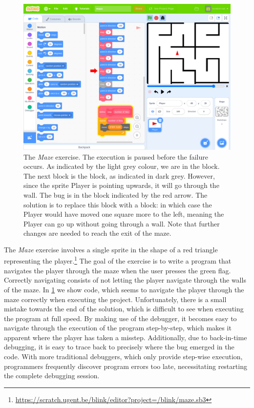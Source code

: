 \documentclass[../main]{subfiles}
\begin{document}
\begin{figure}
    \begin{wide}
        \includegraphics[width=\linewidth]{maze}
    \end{wide}
    \caption[The Maze exercise.]{
        The \emph{Maze} exercise.
        The execution is paused before the failure occurs.
        As indicated by the light grey colour, we are in the  block.
        The next block is the  block, as indicated in dark grey.
        However, since the sprite Player is pointing upwards, it will go through the wall.
        The bug is in the  block indicated by the red arrow.
        The solution is to replace this block with a  block: in which case the Player would have moved one square more to the left, meaning the Player can go up without going through a wall.
        Note that further changes are needed to reach the exit of the maze.
    }
    \label{fig:maze}
\end{figure}

The \emph{Maze} exercise involves a single sprite in the shape of a red triangle representing the player.\footnote{\url{https://scratch.ugent.be/blink/editor?project=/blink/maze.sb3}}
The goal of the exercise is to write a program that navigates the player through the maze when the user presses the green flag.
Correctly navigating consists of not letting the player navigate through the walls of the maze.
In \cref{fig:maze} we show code, which seems to navigate the player through the maze correctly when executing the project.
Unfortunately, there is a small mistake towards the end of the solution, which is difficult to see when executing the program at full speed.
By making use of the debugger, it becomes easy to navigate through the execution of the program step-by-step, which makes it apparent where the player has taken a misstep.
Additionally, due to back-in-time debugging, it is easy to trace back to precisely where the bug emerged in the code.
With more traditional debuggers, which only provide step-wise execution, programmers frequently discover program errors too late, necessitating restarting the complete debugging session.
\end{document}
